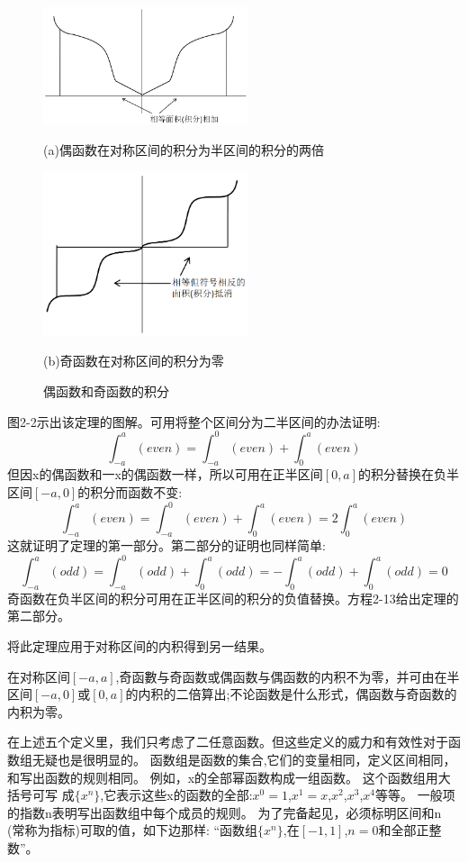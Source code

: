 \begin{figure}[htbp]
    \centering
    \begin{minipage}[t]{0.6\textwidth}
    \centering
    \includegraphics[width=6cm]{./fig/2-2a.png}
    
    (a)偶函数在对称区间的积分为半区间的积分的两倍
    \end{minipage}
    \begin{minipage}[t]{0.6\textwidth}
    \centering
    \includegraphics[width=6cm]{./fig/2-2b.png}
    
    (b)奇函数在对称区间的积分为零
    \end{minipage}
    \caption{偶函数和奇函数的积分}
\end{figure}

图2-2示出该定理的图解。可用将整个区间分为二半区间的办法证明:
\[\int_{-a}^a(even)=\int_{-a}^0(even)+\int_0^a(even) \tag{2-11}\]
但因x的偶函数和一x的偶函数一样，所以可用在正半区间$[0,a]$的积分替换在负半区间$[-a,0]$的积分而函数不变:
\[\int_{-a}^a(even)=\int_{-a}^0(even)+\int_0^a(even)=2\int_0^a(even) \tag{2-12}\]
这就证明了定理的第一部分。第二部分的证明也同样简单:
\[\int_{-a}^a(odd)=\int_{-a}^0(odd)+\int_0^a(odd)=-\int_0^a(odd)+\int_0^a(odd)=0 \tag{2-13}\]
奇函数在负半区间的积分可用在正半区间的积分的负值替换。方程2-13给出定理的第二部分。

将此定理应用于对称区间的内积得到另一结果。
\begin{theorem}
    在对称区间$[-a,a]$,奇函數与奇函数或偶函数与偶函数的内积不为零，并可由在半区间$[-a,0]$或$[0,a]$的内积的二倍算出;不论函数是什么形式，偶函数与奇函数的内积为零。
\end{theorem}

在上述五个定义里，我们只考虑了二任意函数。但这些定义的威力和有效性对于函数组无疑也是很明显的。
函数组是函数的集合,它们的变量相同，定义区间相同，和写出函数的规则相同。
例如，x的全部幂函数构成一组函数。
这个函数组用大括号可写
成$\{x^n\}$,它表示这些x的函数的全部:$x^0=1$,$x^1=x$,$x^2$,$x^3$,$x^4$等等。
一般项的指数n表明写出函数组中每个成员的规则。
为了完备起见，必须标明区间和n (常称为指标)可取的值，如下边那样:
“函数组$\{x^n\}$,在$[-1,1]$,$n=0$和全部正整数”。

